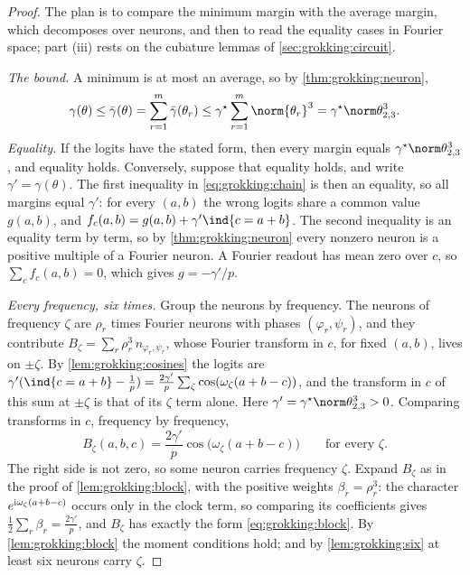 \begin{refsection}
\begin{proof}
The plan is to compare the minimum margin with the average margin, which decomposes over neurons, and then to read the equality cases in Fourier space; part (iii) rests on the cubature lemmas of \cref{sec:grokking:circuit}.

\emph{The bound.} A minimum is at most an average, so by \cref{thm:grokking:neuron},
\begin{equation}\label{eq:grokking:chain}
  \gamma(\theta)\le\grokcw(\theta)=\sum_{r=1}^m\grokcw(\theta_r)\le\gamma^\star\sum_{r=1}^m\norm{\theta_r}^3=\gamma^\star\norm\theta_{2,3}^3 .
\end{equation}
\emph{Equality.} If the logits have the stated form, then every margin equals $\gamma^\star\norm\theta^3_{2,3}$, and equality holds. Conversely, suppose that equality holds, and write $\gamma'=\gamma(\theta)$. The first inequality in \eqref{eq:grokking:chain} is then an equality, so all margins equal $\gamma'$: for every $(a,b)$ the wrong logits share a common value $g(a,b)$, and $f_c(a,b)=g(a,b)+\gamma'\ind\{c=a+b\}$. The second inequality is an equality term by term, so by \cref{thm:grokking:neuron} every nonzero neuron is a positive multiple of a Fourier neuron. A Fourier readout has mean zero over $c$, so $\sum_cf_c(a,b)=0$, which gives $g=-\gamma'/p$.

\emph{Every frequency, six times.} Group the neurons by frequency. The neurons of frequency $\zeta$ are $\rho_r$ times Fourier neurons with phases $(\varphi_r,\psi_r)$, and they contribute $B_\zeta=\sum_r\rho_r^3\,n_{\varphi_r,\psi_r}$, whose Fourier transform in $c$, for fixed $(a,b)$, lives on $\pm\zeta$. By \cref{lem:grokking:cosines} the logits are $\gamma'(\ind\{c=a+b\}-\frac1p)=\frac{2\gamma'}p\sum_\zeta\cos(\omega_\zeta(a+b-c))$, and the transform in $c$ of this sum at $\pm\zeta$ is that of its $\zeta$ term alone. Here $\gamma'=\gamma^\star\norm\theta_{2,3}^3>0$. Comparing transforms in $c$, frequency by frequency,
\[
  B_\zeta(a,b,c)=\frac{2\gamma'}p\cos\bigl(\omega_\zeta(a+b-c)\bigr)\qquad\text{for every }\zeta .
\]
The right side is not zero, so some neuron carries frequency $\zeta$. Expand $B_\zeta$ as in the proof of \cref{lem:grokking:block}, with the positive weights $\beta_r=\rho_r^3$: the character $e^{\mathrm{i}\omega_\zeta(a+b-c)}$ occurs only in the clock term, so comparing its coefficients gives $\frac12\sum_r\beta_r=\frac{2\gamma'}p$, and $B_\zeta$ has exactly the form \eqref{eq:grokking:block}. By \cref{lem:grokking:block} the moment conditions hold; and by \cref{lem:grokking:six} at least six neurons carry $\zeta$.


\end{proof}
\end{refsection}
